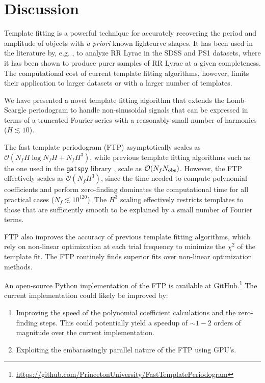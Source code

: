 \documentclass{aastex62}
\newcommand{\bigO}{\mathcal{O}}
\begin{document}
\section{Discussion}\label{sec:discussion}

Template fitting is a powerful technique for accurately recovering
the period and amplitude of objects with \emph{a priori} known
lightcurve shapes. It has been used in the literature by, e.g.
\cite{Sesar_etal_2016, Sesar_etal_2010}, to analyze RR Lyrae in the
SDSS and PS1 datasets, where it has been shown to produce purer
samples of RR Lyrae at a given completeness. The computational
cost of current template fitting algorithms, however, limits their
application to larger datasets or with a larger number of templates.

We have presented a novel template fitting algorithm that extends
the Lomb-Scargle periodogram \citep{Lomb_1976,Scargle_1982,Barning_1963,Vanicek_1971}
to handle non-sinusoidal signals that can be expressed in terms of
a truncated Fourier series with a reasonably small number of harmonics
($H\lesssim 10$).

The fast template periodogram (FTP) asymptotically scales as
$\bigO(N_fH\log N_fH + N_fH^3)$, while previous template fitting algorithms
such as the one used in the \texttt{gatspy} library \citep{gatspy},
scale as $\bigO(N_fN_{\rm obs})$. However, the FTP effectively
scales as $\bigO(N_fH^3)$, since the time needed to compute polynomial
coefficients and perform zero-finding dominates the computational time
for all practical cases ($N_f \lesssim 10^{120}$).
The $H^3$ scaling effectively restricts templates to those that are
sufficiently smooth to be explained by a small number of Fourier terms.

FTP also improves the accuracy of previous template fitting algorithms,
which rely on non-linear optimization at each trial frequency to minimize
the $\chi^2$ of the template fit. The FTP routinely finds superior fits over
non-linear optimization methods.

An open-source Python implementation of the FTP is available at
GitHub.\footnote{\url{https://github.com/PrincetonUniversity/FastTemplatePeriodogram}}
The current implementation could likely be improved by:

\begin{enumerate}
    \item Improving the speed of the polynomial
          coefficient calculations and the zero-finding steps. This could potentially yield
          a speedup of $\sim1-2$ orders of magnitude over the current implementation.
    \item Exploiting the embarassingly parallel nature of the FTP using GPU's.
\end{enumerate}
\end{document}
